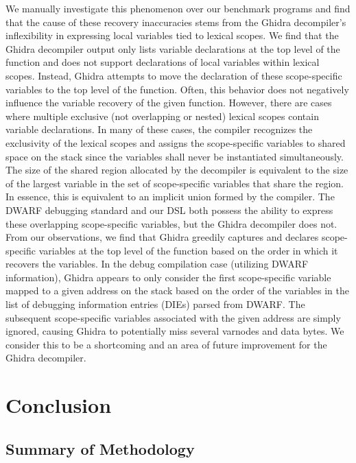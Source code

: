 We manually investigate this phenomenon over our benchmark programs and find that the cause of these recovery inaccuracies stems from the Ghidra decompiler's inflexibility in expressing local variables tied to lexical scopes. We find that the Ghidra decompiler output only lists variable declarations at the top level of the function and does not support declarations of local variables within lexical scopes. Instead, Ghidra attempts to move the declaration of these scope-specific variables to the top level of the function. Often, this behavior does not negatively influence the variable recovery of the given function. However, there are cases where multiple exclusive (not overlapping or nested) lexical scopes contain variable declarations. In many of these cases, the compiler recognizes the exclusivity of the lexical scopes and assigns the scope-specific variables to shared space on the stack since the variables shall never be instantiated simultaneously. The size of the shared region allocated by the decompiler is equivalent to the size of the largest variable in the set of scope-specific variables that share the region. In essence, this is equivalent to an implicit union formed by the compiler. The DWARF debugging standard and our DSL both possess the ability to express these overlapping scope-specific variables, but the Ghidra decompiler does not. From our observations, we find that Ghidra greedily captures and declares scope-specific variables at the top level of the function based on the order in which it recovers the variables. In the debug compilation case (utilizing DWARF information), Ghidra appears to only consider the first scope-specific variable mapped to a given address on the stack based on the order of the variables in the list of debugging information entries (DIEs) parsed from DWARF. The subsequent scope-specific variables associated with the given address are simply ignored, causing Ghidra to potentially miss several varnodes and data bytes. We consider this to be a shortcoming and an area of future improvement for the Ghidra decompiler.

\chapter{Conclusion} \label{sec:conclusion}

\section{Summary of Methodology}

